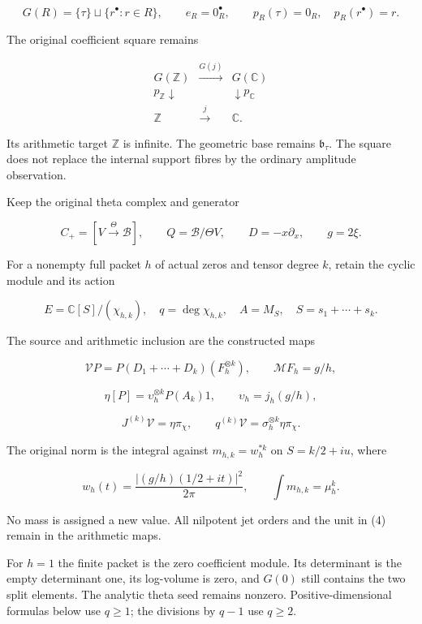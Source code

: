 \[
 G(R)=\{\tau\}\sqcup\{r^\bullet:r\in R\},\qquad
 e_R=0_R^\bullet,\qquad
 p_R(\tau)=0_R,\quad p_R(r^\bullet)=r.
\]

The original coefficient square remains

\[
 \begin{array}{ccc}
 G(\mathbb Z)&\xrightarrow{G(j)}&G(\mathbb C)\\
 p_{\mathbb Z}\downarrow&&\downarrow p_{\mathbb C}\\
 \mathbb Z&\xrightarrow{j}&\mathbb C.
 \end{array}                                                     \tag{3}
\]

Its arithmetic target \(\mathbb Z\) is infinite. The geometric base remains \(\mathfrak b_\tau\). The square does not replace the internal support fibres by the ordinary amplitude observation.

Keep the original theta complex and generator

\[
 C_+=[V\xrightarrow{\Theta}\mathscr B],\qquad
 Q=\mathscr B/\Theta V,\qquad D=-x\partial_x,\qquad g=2\xi.
\]

For a nonempty full packet \(h\) of actual zeros and tensor degree \(k\), retain the cyclic module and its action

\[
 E=\mathbb C[S]/(\chi_{h,k}),\quad q=\deg\chi_{h,k},\quad A=M_S,
 \quad S=s_1+\cdots+s_k.
\]

The source and arithmetic inclusion are the constructed maps

\[
 \mathcal VP=P(D_1+\cdots+D_k)(F_h^{\otimes k}),\qquad
 \mathcal MF_h=g/h,
\]

\[
 \eta[P]=\upsilon_h^{\otimes k}P(A_k)1,\qquad
 \upsilon_h=j_h(g/h),                                             \tag{4}
\]

\[
 J^{(k)}\mathcal V=\eta\pi_\chi,\qquad
 q^{(k)}\mathcal V=\sigma_h^{\otimes k}\eta\pi_\chi.
\]

The original norm is the integral against \(m_{h,k}=w_h^{*k}\) on \(S=k/2+iu\), where

\[
 w_h(t)=\frac{|(g/h)(1/2+it)|^2}{2\pi},\qquad
 \int m_{h,k}=\mu_h^k.
\]

No mass is assigned a new value. All nilpotent jet orders and the unit in (4) remain in the arithmetic maps.

For \(h=1\) the finite packet is the zero coefficient module. Its determinant is the empty determinant one, its log-volume is zero, and \(G(0)\) still contains the two split elements. The analytic theta seed remains nonzero. Positive-dimensional formulas below use \(q\ge1\); the divisions by \(q-1\) use \(q\ge2\).

